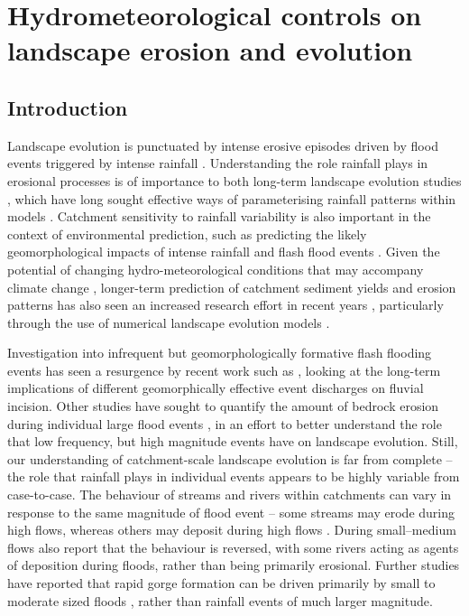 \chapter{Hydrometeorological controls on landscape erosion and evolution}
\label{chapter_hydrogeomorph}

\section{Introduction}

Landscape evolution is punctuated by intense erosive episodes driven by flood events triggered by intense rainfall \citep{Wolman1960,newson1980geomorphological,Costa1995}. Understanding the role rainfall plays in erosional processes is of importance to both long-term landscape evolution studies \citep[e.g.][]{rinaldo1995geomorphological,tucker1997drainage,Tucker2000}, which have long sought effective ways of parameterising rainfall patterns within models \citep[e.g][]{Eagleson1978}.  Catchment sensitivity to rainfall variability is also important in the context of environmental prediction, such as predicting the likely geomorphological impacts of intense rainfall and flash flood events \citep[e.g.][]{lane2007interactions,deluis2010rainfall,milan2012geomorphic}. Given the potential of changing hydro-meteorological conditions that may accompany climate change \citep{Kendon2014}, longer-term prediction of catchment sediment yields and erosion patterns has also seen an increased research effort in recent years \citep{coulthard2000modelling,Coulthard2012,hancock2017sediment}, particularly through the use of numerical landscape evolution models \citep{Tucker2010}.

Investigation into infrequent but geomorphologically formative flash flooding events has seen a resurgence by recent work such as \citet{Huang2006}, looking at the long-term implications of different geomorphically effective event discharges on fluvial incision. Other studies have sought to quantify the amount of bedrock erosion during individual large flood events \citep[e.g.][]{gupta2007catastrophic,lamb2010rapid,baynes2015erosion}, in an effort to better understand the role that low frequency, but high magnitude events have on landscape evolution. Still, our understanding of catchment-scale landscape evolution is far from complete -- the role that rainfall plays in individual events appears to be highly variable from case-to-case. The behaviour of streams and rivers within catchments can vary in response to the same magnitude of flood event -- some streams may erode during high flows, whereas others may deposit during high flows \citep{turowski2013large}. During small--medium flows \citet{turowski2013large} also report that the behaviour is reversed, with some rivers acting as agents of deposition during floods, rather than being primarily erosional. Further studies have reported that rapid gorge formation can be driven primarily by small to moderate sized floods \citep{anton2015exceptional}, rather than rainfall events of much larger magnitude.

